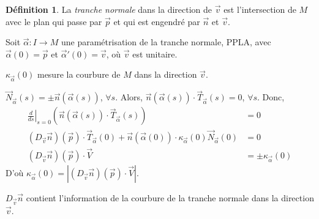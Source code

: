 \documentclass{report}
\theoremstyle{definition}
\newtheorem*{dfn}{D\'efinition}
\theoremstyle{remark}
\newcommand*{\abs}[1]{\left|#1\right|}
\begin{document}
	\begin{dfn}
		La \emph{tranche normale} dans la direction de $\vec v$ est l'intersection de $M$ avec le plan qui passe par $\vec p$ et qui est engendr\'e par $\vec n$ et $\vec v$.

		Soit $\vec\alpha:I\to M$ une param\'etrisation de la tranche normale, PPLA, avec $\vec\alpha(0)=\vec p$ et $\vec\alpha'(0)=\vec v$, o\`u $\vec v$ est unitaire.

		$\kappa_{\vec\alpha}(0)$ mesure la courbure de $M$ dans la direction $\vec v$.

		$\vec N_{\vec\alpha}(s)=\pm\vec n(\vec\alpha(s))$, $\forall s$. Alors, $\vec n(\vec\alpha(s)) \cdot \vec T_{\vec\alpha}(s)=0$, $\forall s$. Donc,
		\begin{align*}
			\left.\frac{d}{ds}\right|_{s=0}\left(\vec n(\vec\alpha(s))\cdot\vec T_{\vec\alpha}(s)\right)&=0\\
			(D_{\vec v}\vec n)(\vec p) \cdot \vec T_{\vec\alpha}(0) + \vec n(\vec\alpha(0)) \cdot \kappa_{\vec\alpha}(0)\vec N_{\vec\alpha}(0)&= 0\\
			(D_{\vec v}\vec n)(\vec p) \cdot \vec V&= \pm\kappa_{\vec\alpha}(0)
		\end{align*}
		D'o\`u $\kappa_{\vec\alpha}(0) = \abs{(D_{\vec v}\vec n)(\vec p) \cdot \vec V}$.

		$D_{\vec v}\vec n$ contient l'information de la courbure de la tranche normale dans la direction $\vec v$.
	\end{dfn}
\end{document}
